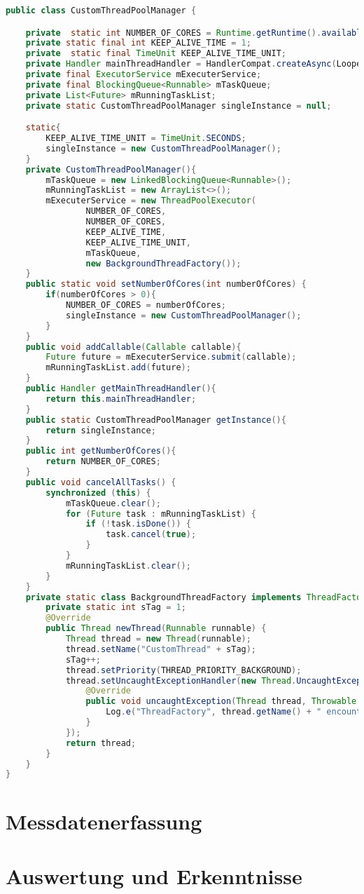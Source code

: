 \begin{lstlisting}[language=java,caption={der CustomThreadManager aus der EnergyEfficience App},label=lst:CustomThreadManager]
public class CustomThreadPoolManager {

    private  static int NUMBER_OF_CORES = Runtime.getRuntime().availableProcessors();
    private static final int KEEP_ALIVE_TIME = 1;
    private  static final TimeUnit KEEP_ALIVE_TIME_UNIT;
    private Handler mainThreadHandler = HandlerCompat.createAsync(Looper.getMainLooper());
    private final ExecutorService mExecuterService;
    private final BlockingQueue<Runnable> mTaskQueue;
    private List<Future> mRunningTaskList;
    private static CustomThreadPoolManager singleInstance = null;

    static{
        KEEP_ALIVE_TIME_UNIT = TimeUnit.SECONDS;
        singleInstance = new CustomThreadPoolManager();
    }
    private CustomThreadPoolManager(){
        mTaskQueue = new LinkedBlockingQueue<Runnable>();
        mRunningTaskList = new ArrayList<>();
        mExecuterService = new ThreadPoolExecutor(
                NUMBER_OF_CORES,
                NUMBER_OF_CORES,
                KEEP_ALIVE_TIME,
                KEEP_ALIVE_TIME_UNIT,
                mTaskQueue,
                new BackgroundThreadFactory());
    }
    public static void setNumberOfCores(int numberOfCores) {
        if(numberOfCores > 0){
            NUMBER_OF_CORES = numberOfCores;
            singleInstance = new CustomThreadPoolManager();
        }
    }
    public void addCallable(Callable callable){
        Future future = mExecuterService.submit(callable);
        mRunningTaskList.add(future);
    }
    public Handler getMainThreadHandler(){
        return this.mainThreadHandler;
    }
    public static CustomThreadPoolManager getInstance(){
        return singleInstance;
    }
    public int getNumberOfCores(){
        return NUMBER_OF_CORES;
    }
    public void cancelAllTasks() {
        synchronized (this) {
            mTaskQueue.clear();
            for (Future task : mRunningTaskList) {
                if (!task.isDone()) {
                    task.cancel(true);
                }
            }
            mRunningTaskList.clear();
        }
    }
    private static class BackgroundThreadFactory implements ThreadFactory {
        private static int sTag = 1;
        @Override
        public Thread newThread(Runnable runnable) {
            Thread thread = new Thread(runnable);
            thread.setName("CustomThread" + sTag);
            sTag++;
            thread.setPriority(THREAD_PRIORITY_BACKGROUND);
            thread.setUncaughtExceptionHandler(new Thread.UncaughtExceptionHandler() {
                @Override
                public void uncaughtException(Thread thread, Throwable ex) {
                    Log.e("ThreadFactory", thread.getName() + " encountered an error: " + ex.getMessage());
                }
            });
            return thread;
        }
    }
}
\end{lstlisting}

\section{Messdatenerfassung}
\section{Auswertung und Erkenntnisse}